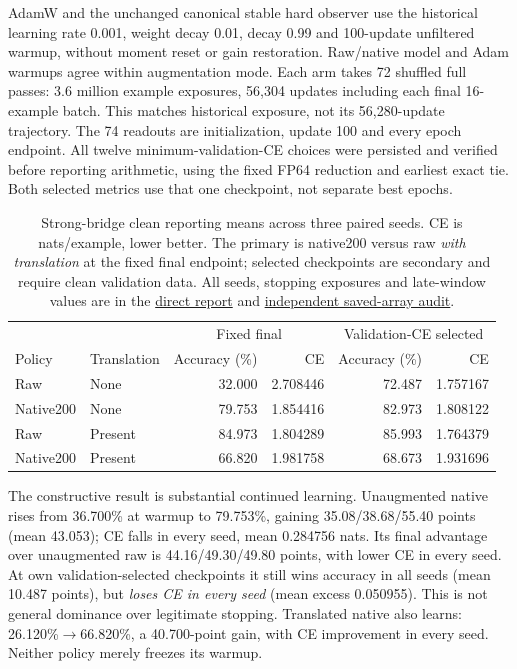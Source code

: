 \documentclass[10pt]{article}
\newcommand{\src}[2]{\href{../../../#1}{#2}}
\begin{document}
AdamW and the unchanged canonical stable hard observer use the historical learning rate 0.001, weight decay 0.01, decay 0.99 and 100-update unfiltered warmup, without moment reset or gain restoration. Raw/native model and Adam warmups agree within augmentation mode. Each arm takes 72 shuffled full passes: 3.6 million example exposures, 56,304 updates including each final 16-example batch. This matches historical exposure, not its 56,280-update trajectory. The 74 readouts are initialization, update 100 and every epoch endpoint. All twelve minimum-validation-CE choices were persisted and verified before reporting arithmetic, using the fixed FP64 reduction and earliest exact tie. Both selected metrics use that one checkpoint, not separate best epochs.

\begin{table}[!ht]
\centering\small
\begin{tabular}{llrrrr}\toprule
& & \multicolumn{2}{c}{Fixed final} & \multicolumn{2}{c}{Validation-CE selected}\\
Policy & Translation & Accuracy (\%) & CE & Accuracy (\%) & CE\\\midrule
Raw & None & 32.000 & 2.708446 & 72.487 & 1.757167\\
Native200 & None & 79.753 & 1.854416 & 82.973 & 1.808122\\
Raw & Present & 84.973 & 1.804289 & 85.993 & 1.764379\\
Native200 & Present & 66.820 & 1.981758 & 68.673 & 1.931696\\\bottomrule
\end{tabular}
\caption{Strong-bridge clean reporting means across three paired seeds. CE is nats/example, lower better. The primary is native200 versus raw \emph{with translation} at the fixed final endpoint; selected checkpoints are secondary and require clean validation data. All seeds, stopping exposures and late-window values are in the \src{output/2026-09-10-spectral-strong-augmentation/results.md}{direct report} and \src{output/2026-09-10-spectral-strong-augmentation/audit.json}{independent saved-array audit}.}
\label{tab:strong-augmentation}
\end{table}

The constructive result is substantial continued learning. Unaugmented native rises from 36.700\% at warmup to 79.753\%, gaining 35.08/38.68/55.40 points (mean 43.053); CE falls in every seed, mean 0.284756 nats. Its final advantage over unaugmented raw is 44.16/49.30/49.80 points, with lower CE in every seed. At own validation-selected checkpoints it still wins accuracy in all seeds (mean 10.487 points), but \emph{loses CE in every seed} (mean excess 0.050955). This is not general dominance over legitimate stopping. Translated native also learns: 26.120\%$\to$66.820\%, a 40.700-point gain, with CE improvement in every seed. Neither policy merely freezes its warmup.
\end{document}
